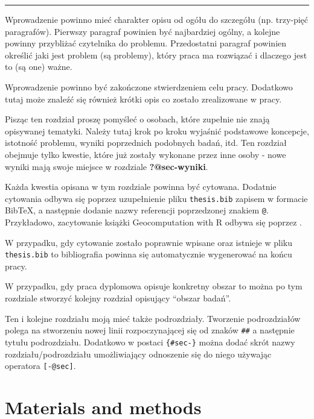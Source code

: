 \documentclass{amuthesis}
\begin{document}
\begin{center}\rule{0.5\linewidth}{0.5pt}\end{center}

Wprowadzenie powinno mieć charakter opisu od ogółu do szczegółu (np.
trzy-pięć paragrafów). Pierwszy paragraf powinien być najbardziej
ogólny, a kolejne powinny przybliżać czytelnika do problemu.
Przedostatni paragraf powinien określić jaki jest problem (są problemy),
który praca ma rozwiązać i dlaczego jest to (są one) ważne.

Wprowadzenie powinno być zakończone stwierdzeniem celu pracy. Dodatkowo
tutaj może znaleźć się również krótki opis co zostało zrealizowane w
pracy.

Pisząc ten rozdział proszę pomyśleć o osobach, które zupełnie nie znają
opisywanej tematyki. Należy tutaj krok po kroku wyjaśnić podstawowe
koncepcje, istotność problemu, wyniki poprzednich podobnych badań, itd.
Ten rozdział obejmuje tylko kwestie, które już zostały wykonane przez
inne osoby - nowe wyniki mają swoje miejsce w rozdziale
\textbf{?@sec-wyniki}.

Każda kwestia opisana w tym rozdziale powinna być cytowana. Dodatnie
cytowania odbywa się poprzez uzupełnienie pliku \texttt{thesis.bib}
zapisem w formacie BibTeX, a następnie dodanie nazwy referencji
poprzedzonej znakiem \texttt{@}. Przykładowo, zacytowanie książki
Geocomputation with R odbywa się poprzez
\autocite{lovelace_geocomputation_2019}.

W przypadku, gdy cytowanie zostało poprawnie wpisane oraz istnieje w
pliku \texttt{thesis.bib} to bibliografia powinna się automatycznie
wygenerować na końcu pracy.

W przypadku, gdy praca dyplomowa opisuje konkretny obszar to można po
tym rozdziale stworzyć kolejny rozdział opisujący ``obszar badań''.

Ten i kolejne rozdziału moją mieć także podrozdziały. Tworzenie
podrozdziałów polega na stworzeniu nowej linii rozpoczynającej się od
znaków \texttt{\#\#} a następnie tytułu podrozdziału. Dodatkowo w
postaci \texttt{\{\#sec-\}} można dodać skrót nazwy
rozdziału/podrozdziału umożliwiający odnoszenie się do niego używając
operatora \texttt{{[}-@sec{]}}.


\hypertarget{sec-data-methods}{%
\chapter{Materials and methods}\label{sec-data-methods}}
\end{document}
